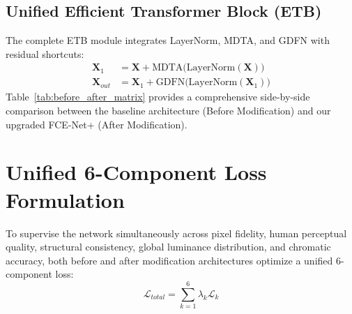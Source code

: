 \documentclass[10pt,twocolumn,letterpaper]{article}
\begin{document}
\subsection{Unified Efficient Transformer Block (ETB)}
The complete ETB module integrates LayerNorm, MDTA, and GDFN with residual shortcuts:
\begin{align}
\mathbf{X}_1 &= \mathbf{X} + \text{MDTA}\big( \text{LayerNorm}(\mathbf{X}) \big) \\
\mathbf{X}_{out} &= \mathbf{X}_1 + \text{GDFN}\big( \text{LayerNorm}(\mathbf{X}_1) \big)
\end{align}
Table~\ref{tab:before_after_matrix} provides a comprehensive side-by-side comparison between the baseline architecture (Before Modification) and our upgraded FCE-Net+ (After Modification).

\section{Unified 6-Component Loss Formulation}
To supervise the network simultaneously across pixel fidelity, human perceptual quality, structural consistency, global luminance distribution, and chromatic accuracy, both before and after modification architectures optimize a unified 6-component loss:
\begin{equation}
\mathcal{L}_{total} = \sum_{k=1}^6 \lambda_k \mathcal{L}_k
\end{equation}

\begin{table}[h]
\centering
\small
\caption{\textbf{Composite Loss Function Components and Hyper-parameters.}}
\label{tab:loss_weights}
\end{table}
\end{document}
